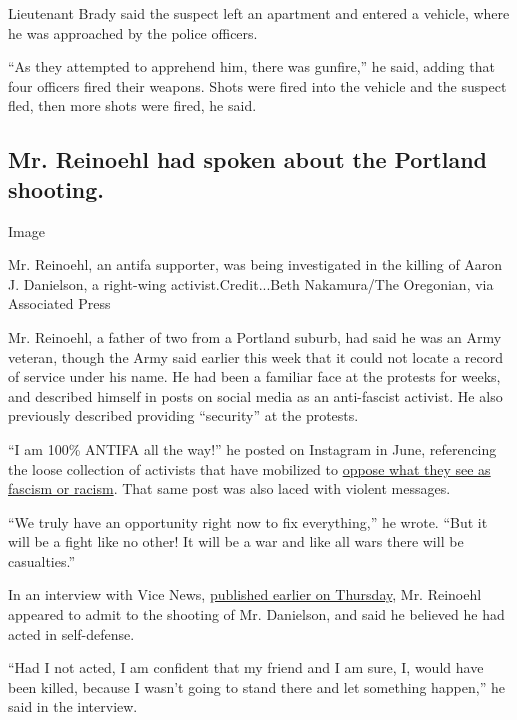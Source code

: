 Lieutenant Brady said the suspect left an apartment and entered a
vehicle, where he was approached by the police officers.

``As they attempted to apprehend him, there was gunfire,'' he said,
adding that four officers fired their weapons. Shots were fired into the
vehicle and the suspect fled, then more shots were fired, he said.

\hypertarget{mr-reinoehl-had-spoken-about-the-portland-shooting}{%
\subsection{Mr. Reinoehl had spoken about the Portland
shooting.}\label{mr-reinoehl-had-spoken-about-the-portland-shooting}}

Image

Mr. Reinoehl, an antifa supporter, was being investigated in the killing
of Aaron J. Danielson, a right-wing activist.Credit...Beth Nakamura/The
Oregonian, via Associated Press

Mr. Reinoehl, a father of two from a Portland suburb, had said he was an
Army veteran, though the Army said earlier this week that it could not
locate a record of service under his name. He had been a familiar face
at the protests for weeks, and described himself in posts on social
media as an anti-fascist activist. He also previously described
providing ``security'' at the protests.

``I am 100\% ANTIFA all the way!'' he posted on Instagram in June,
referencing the loose collection of activists that have mobilized to
\href{https://www.nytimes3xbfgragh.onion/article/what-antifa-trump.html}{oppose
what they see as fascism or racism}. That same post was also laced with
violent messages.

``We truly have an opportunity right now to fix everything,'' he wrote.
``But it will be a fight like no other! It will be a war and like all
wars there will be casualties.''

In an interview with Vice News,
\href{https://www.vice.com/en_us/article/v7g8vb/man-linked-to-killing-at-a-portland-protest-says-he-acted-in-self-defense}{published
earlier on Thursday}, Mr. Reinoehl appeared to admit to the shooting of
Mr. Danielson, and said he believed he had acted in self-defense.

``Had I not acted, I am confident that my friend and I am sure, I, would
have been killed, because I wasn't going to stand there and let
something happen,'' he said in the interview.

